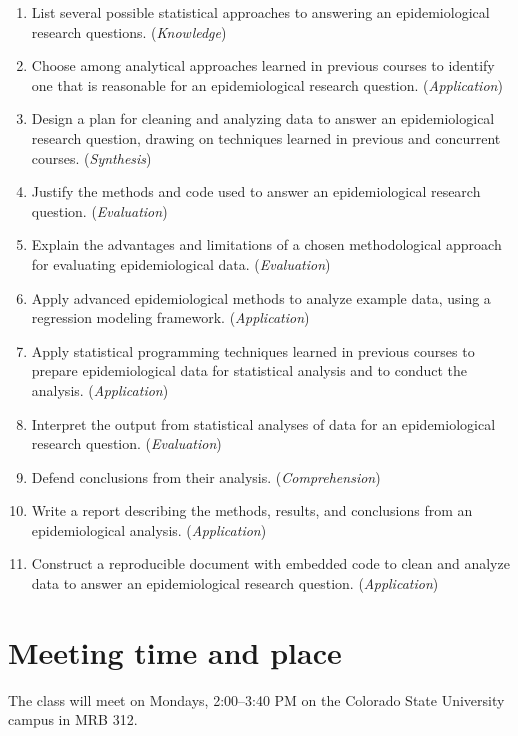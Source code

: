 \documentclass[
]{book}
\providecommand{\tightlist}{%
  \setlength{\itemsep}{0pt}\setlength{\parskip}{0pt}}
\begin{document}
\begin{enumerate}
\def\labelenumi{\arabic{enumi}.}
\tightlist
\item
  List several possible statistical approaches to answering an epidemiological
  research questions. (\emph{Knowledge})
\item
  Choose among analytical approaches learned in previous courses to identify
  one that is reasonable for an epidemiological research question. (\emph{Application})
\item
  Design a plan for cleaning and analyzing data to answer an epidemiological
  research question, drawing on techniques learned in previous and concurrent
  courses. (\emph{Synthesis})
\item
  Justify the methods and code used to answer an epidemiological research
  question. (\emph{Evaluation})
\item
  Explain the advantages and limitations of a chosen methodological approach
  for evaluating epidemiological data. (\emph{Evaluation})
\item
  Apply advanced epidemiological methods to analyze example data, using a
  regression modeling framework. (\emph{Application})
\item
  Apply statistical programming techniques learned in previous courses to
  prepare epidemiological data for statistical analysis and to conduct the
  analysis. (\emph{Application})
\item
  Interpret the output from statistical analyses of data for an epidemiological
  research question. (\emph{Evaluation})
\item
  Defend conclusions from their analysis. (\emph{Comprehension})
\item
  Write a report describing the methods, results, and conclusions from an
  epidemiological analysis. (\emph{Application})
\item
  Construct a reproducible document with embedded code to clean and analyze
  data to answer an epidemiological research question. (\emph{Application})
\end{enumerate}

\hypertarget{meeting-time-and-place}{%
\section{Meeting time and place}\label{meeting-time-and-place}}

The class will meet on Mondays, 2:00--3:40 PM on the Colorado State University
campus in MRB 312.
\end{document}
